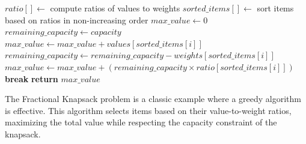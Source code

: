 \documentclass[12pt]{book} %
\begin{document}
\FloatBarrier
\begin{algorithm}
\caption{Greedy Algorithm for Fractional Knapsack Problem}
\begin{algorithmic}[1]
\State $ratio[] \gets$ compute ratios of values to weights
\State $sorted\_items[] \gets$ sort items based on ratios in non-increasing order
\State $max\_value \gets 0$
\State $remaining\_capacity \gets capacity$
        \State $max\_value \gets max\_value + values[sorted\_items[i]]$
        \State $remaining\_capacity \gets remaining\_capacity - weights[sorted\_items[i]]$
    \Else
        \State $max\_value \gets max\_value + (remaining\_capacity \times ratio[sorted\_items[i]])$
        \State \textbf{break}
    \EndIf
\EndFor
\State \textbf{return} $max\_value$
\EndProcedure
\end{algorithmic}
\end{algorithm}
\FloatBarrier

The Fractional Knapsack problem is a classic example where a greedy algorithm is effective. This algorithm selects items based on their value-to-weight ratios, maximizing the total value while respecting the capacity constraint of the knapsack.
\end{document}
